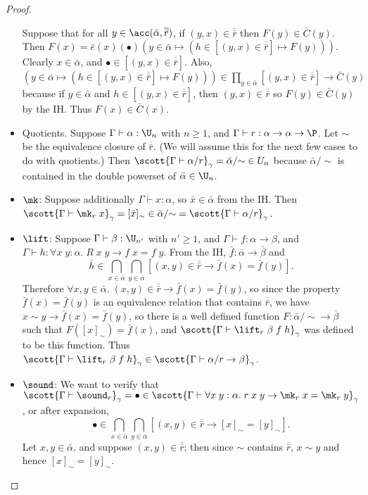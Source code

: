 \begin{proof}
\begin{itemize}
Suppose that for all $y\in\acc(\bar\alpha,\overline{\bar r})$, if $(y,x)\in\overline{\bar r}$ then $F(y)\in\bar C(y)$. Then $F(x)=\bar e(x)(\bullet)(y\in \bar\alpha\mapsto(h\in[(y,x)\in\overline{\bar r}]\mapsto F(y)))$. Clearly $x\in\bar\alpha$, and $\bullet\in[(y,x)\in\overline{\bar r}]$. Also, $(y\in \bar\alpha\mapsto(h\in[(y,x)\in\overline{\bar r}]\mapsto F(y)))\in\prod_{y\in\bar\alpha}[(y,x)\in\overline{\bar r}]\to\bar C(y)$ because if $y\in\bar\alpha$ and $h\in[(y,x)\in\overline{\bar r}]$, then $(y,x)\in\overline{\bar r}$ so $F(y)\in\bar C(y)$ by the IH. Thus $F(x)\in\bar C(x)$.
\item Quotients. Suppose $\Gamma\vdash\alpha:\U_n$ with $n\ge 1$, and $\Gamma\vdash r:\alpha\to\alpha\to\P$. Let $\sim$ be the equivalence closure of $\overline{\bar r}$. (We will assume this for the next few cases to do with quotients.) Then $\scott{\Gamma\vdash \alpha/r}_\gamma=\bar\alpha/{\sim}\in U_n$ because $\bar\alpha/{\sim}$ is contained in the double powerset of $\bar\alpha\in\U_n$.
\item $\mk$: Suppose additionally $\Gamma\vdash x:\alpha$, so $\bar x\in\bar \alpha$ from the IH. Then $\scott{\Gamma\vdash\mk_r\;x}_\gamma=[\bar x]_{\sim}\in\bar\alpha/{\sim}=\scott{\Gamma\vdash \alpha/r}_\gamma$.
\item $\lift$: Suppose $\Gamma\vdash\beta:\U_{n'}$ with $n'\ge 1$, and $\Gamma\vdash f:\alpha\to\beta$, and\\
$\Gamma\vdash h:\forall x\;y:\alpha.\;R\;x\;y\to f\;x=f\;y$. From the IH, $\bar f:\bar\alpha\to\bar\beta$ and
$$\bar h\in\bigcap_{x\in\bar\alpha}\bigcap_{y\in\bar\alpha}[(x,y)\in\overline{\bar r}\to\bar f(x)=\bar f(y)].$$
Therefore $\forall x,y\in \bar\alpha.\;(x,y)\in\overline{\bar r}\to\bar f(x)=\bar f(y)$, so since the property $\bar f(x)=\bar f(y)$ is an equivalence relation that contains $\overline{\bar r}$, we have $x\sim y\to \bar f(x)=\bar f(y)$, so there is a well defined function $F:\bar\alpha/{\sim}\to\bar\beta$ such that $F([x]_{\sim})=\bar f(x)$, and $\scott{\Gamma\vdash\lift_r\;\beta\;f\;h}_\gamma$ was defined to be this function. Thus $\scott{\Gamma\vdash\lift_r\;\beta\;f\;h}_\gamma\in \scott{\Gamma\vdash\alpha/r\to\beta}_\gamma$.
\item $\sound$: We want to verify that $\scott{\Gamma\vdash\sound_r}_\gamma=\bullet\in\scott{\Gamma\vdash\forall x\;y:\alpha.\;r\;x\;y\to\mk_r\;x=\mk_r\;y}_\gamma$, or after expansion,
$$\bullet\in\bigcap_{x\in\bar\alpha}\bigcap_{y\in\bar\alpha}[(x,y)\in\overline{\bar r}\to[x]_{\sim}=[y]_{\sim}].$$
Let $x,y\in\bar\alpha$, and suppose $(x,y)\in\overline{\bar r}$; then since $\sim$ contains $\overline{\bar r}$, $x\sim y$ and hence $[x]_{\sim}=[y]_{\sim}$.

\end{itemize}
\end{proof}
